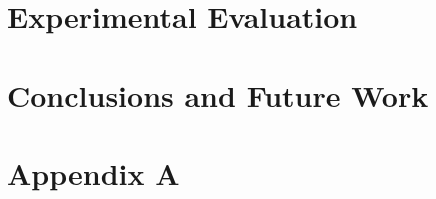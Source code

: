 \documentclass[
     12pt,         %
     a4paper,      %
     BCOR10mm,     %
     DIV14,        %
     ]{scrreprt}
\begin{document}


\newpage

\chapter{Experimental Evaluation}
\label{chap:eval}



\newpage

\chapter{Conclusions and Future Work}
\label{chap:concl}




\appendix

\chapter{Appendix A}
\label{app:appendixA}


% 


\end{document}
